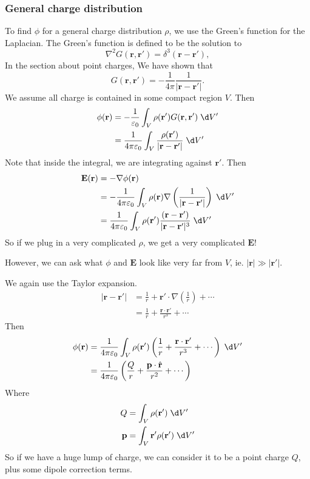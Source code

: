 \documentclass[a4paper]{article}
\begin{document}
\subsubsection{General charge distribution}
To find $\phi$ for a general charge distribution $\rho$, we use the Green's function for the Laplacian. The Green's function is defined to be the solution to
\[
  \nabla^2 G(\mathbf{r}, \mathbf{r}') = \delta^3(\mathbf{r} - \mathbf{r}'),
\]
In the section about point charges, We have shown that
\[
  G(\mathbf{r}, \mathbf{r}') = -\frac{1}{4\pi}\frac{1}{|\mathbf{r} - \mathbf{r}'|}.
\]
We assume all charge is contained in some compact region $V$. Then
\begin{align*}
  \phi(\mathbf{r}) &= -\frac{1}{\varepsilon_0}\int_V \rho(\mathbf{r}') G(\mathbf{r}, \mathbf{r}')\;\d V'\\
  &= \frac{1}{4\pi\varepsilon_0}\int_V \frac{\rho(\mathbf{r}')}{|\mathbf{r} - \mathbf{r}'|}\;\d V'
\end{align*}
Note that inside the integral, we are integrating against $\mathbf{r}'$. Then
\begin{align*}
  \mathbf{E}(\mathbf{r}) &= -\nabla \phi(\mathbf{r})\\
  &=- \frac{1}{4\pi\varepsilon_0} \int_V \rho(\mathbf{r})\nabla \left(\frac{1}{|\mathbf{r} - \mathbf{r}'|}\right)\;\d V'\\
  &= \frac{1}{4\pi\varepsilon_0}\int_V \rho(\mathbf{r}')\frac{(\mathbf{r} - \mathbf{r}')}{|\mathbf{r} - \mathbf{r}'|^3}\;\d V'
\end{align*}
So if we plug in a very complicated $\rho$, we get a very complicated $\mathbf{E}$!

However, we can ask what $\phi$ and $\mathbf{E}$ look like very far from $V$, ie. $|\mathbf{r}| \gg |\mathbf{r}'|$.

We again use the Taylor expansion.
\begin{align*}
  |\mathbf{r} - \mathbf{r}'| &= \frac{1}{r} + \mathbf{r}'\cdot \nabla\left(\frac{1}{r}\right) + \cdots\\
  &= \frac{1}{r} + \frac{\mathbf{r}\cdot \mathbf{r}'}{r^3} + \cdots
\end{align*}
Then
\begin{align*}
  \phi(\mathbf{r}) &= \frac{1}{4\pi\varepsilon_0} \int_V \rho(\mathbf{r}')\left(\frac{1}{r} + \frac{\mathbf{r}\cdot \mathbf{r}'}{r^3} + \cdots\right)\;\d V'\\
  &= \frac{1}{4\pi\varepsilon_0}\left(\frac{Q}{r} + \frac{\mathbf{p}\cdot \hat{\mathbf{r}}}{r^2} + \cdots\right)
\end{align*}
Where
\begin{align*}
  Q &= \int_V \rho(\mathbf{r}')\;\d V' \\
  \mathbf{p} &= \int_V \mathbf{r}'\rho(\mathbf{r}')\; \d V'
\end{align*}
So if we have a huge lump of charge, we can consider it to be a point charge $Q$, plus some dipole correction terms.
\end{document}
